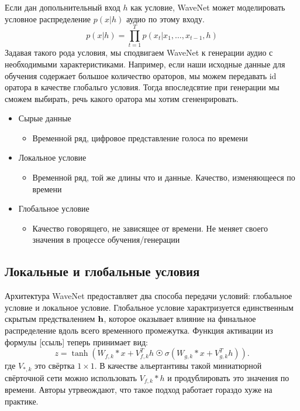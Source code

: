 \documentclass[../diploma.tex]{subfiles}
\begin{document}
Если дан допольнительный вход $h$ как условие, WaveNet может моделировать условное распределение $p(x|h)$ аудио по этому входу.
$$p(x|h) = \prod^{T}_{t=1}{p(x_{t}|x_1, \dots, x_{t-1}, h)}$$
Задавая такого рода условия, мы сподвигаем WaveNet к генерации аудио с необходимыми характеристиками. Например, если наши исходные данные для обучения содержает большое количество ораторов, мы можем передавать id оратора в качестве глобальго условия. Тогда впоследсвтие при генерации мы сможем выбирать, речь какого оратора мы хотим сгененрировать. 

\begin{itemize}
    \item Сырые данные
    \begin{itemize}
        \item Временной ряд, цифровое представление голоса по времени
    \end{itemize}
    \item Локальное условие 
    \begin{itemize}
        \item Временной ряд, той же длины что и данные. Качество, изменяющееся по времени
    \end{itemize}
    \item Глобальное условие
    \begin{itemize}
        \item Качество говорящего, не зависящее от времени. Не меняет своего значения в процессе обучения/генерации
    \end{itemize}
\end{itemize}


\subsection{Локальные и глобальные условия}
Архитектура WaveNet предоставляет два способа передачи условий: глобальное условие и локальное условие. Глобальное условие характризуется единственным скрытым предствалением $\bf{h}$, которое оказывает влияние на финальное распределение вдоль всего временного промежутка. Функция активации из формулы [ссыль] теперь принимает вид:
$$
z = \tanh(W_{f,k} * x + V_{f,k}^T h~\astrosun~\sigma (W_{g,k} * x + V_{g,k}^T h)).
$$
где $V_{*,k}$ это свёртка $1 \times 1$. В качестве альертантивы такой миниатюрной свёрточной сети можно использовать $V_{f,k} * h$ и продублировать это значения по времени. Авторы утрвеождают, что такое подход работает гораздо хуже на практике.  
\end{document}
